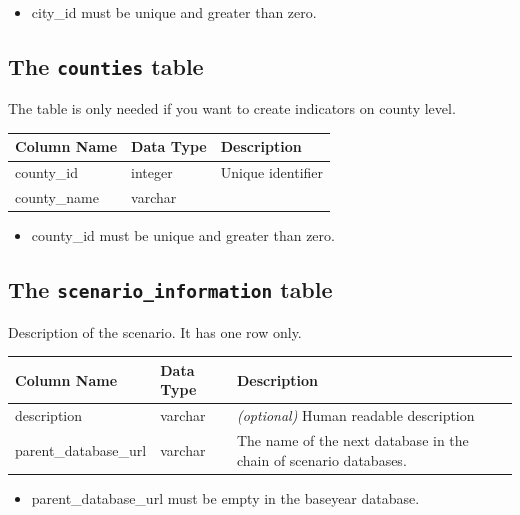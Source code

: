 \begin{itemize} \tight
\item city_id must be unique and greater than zero.

\end{itemize}

\subsection{The {\tt counties} table}

The table is only needed if you want to create indicators on county level. 

\begin{tabular}{lll}
\textbf{Column Name} & \textbf{Data Type} & \textbf{Description} \\
\hline
county_id & integer & Unique identifier  \\
\hline
county_name & varchar & \\
\hline

\end{tabular}

\begin{itemize} \tight
\item county_id must be unique and greater than zero.

\end{itemize}


\subsection{The {\tt scenario_information} table}
\label{urbansim-database-tables-scenario-inforamtion}

Description of the scenario. It has one row only.


\begin{tabular}{llp{3.9in}}
\textbf{Column Name} & \textbf{Data Type} & \textbf{Description} \\
\hline description & varchar & \emph{(optional) }
Human readable description  \\
\hline
parent_database_url & varchar & The name of the next database in the chain of scenario databases.  \\
\hline

\end{tabular}

\begin{itemize} \tight
\item parent_database_url must be empty in the baseyear database.

\end{itemize}

